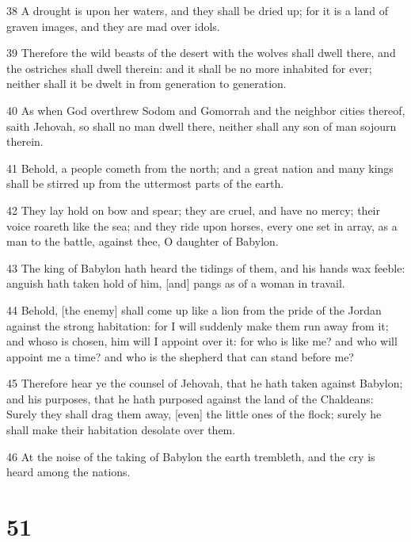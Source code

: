 \par 38 A drought is upon her waters, and they shall be dried up; for it is a land of graven images, and they are mad over idols.
\par 39 Therefore the wild beasts of the desert with the wolves shall dwell there, and the ostriches shall dwell therein: and it shall be no more inhabited for ever; neither shall it be dwelt in from generation to generation.
\par 40 As when God overthrew Sodom and Gomorrah and the neighbor cities thereof, saith Jehovah, so shall no man dwell there, neither shall any son of man sojourn therein.
\par 41 Behold, a people cometh from the north; and a great nation and many kings shall be stirred up from the uttermost parts of the earth.
\par 42 They lay hold on bow and spear; they are cruel, and have no mercy; their voice roareth like the sea; and they ride upon horses, every one set in array, as a man to the battle, against thee, O daughter of Babylon.
\par 43 The king of Babylon hath heard the tidings of them, and his hands wax feeble: anguish hath taken hold of him, [and] pangs as of a woman in travail.
\par 44 Behold, [the enemy] shall come up like a lion from the pride of the Jordan against the strong habitation: for I will suddenly make them run away from it; and whoso is chosen, him will I appoint over it: for who is like me? and who will appoint me a time? and who is the shepherd that can stand before me?
\par 45 Therefore hear ye the counsel of Jehovah, that he hath taken against Babylon; and his purposes, that he hath purposed against the land of the Chaldeans: Surely they shall drag them away, [even] the little ones of the flock; surely he shall make their habitation desolate over them.
\par 46 At the noise of the taking of Babylon the earth trembleth, and the cry is heard among the nations.

\chapter{51}

